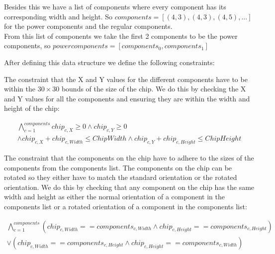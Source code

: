 \documentclass[12pt]{article}
\begin{document}
Besides this we have a list of components where every component has its corresponding width and height. So $components = [(4,3),(4,3),(4,5),...]$ for the power components and the regular components.\\
From this list of components we take the first 2 components to be the power components, so $powercomponents = [ components_0, components_1 ]$

After defining this data structure we define the following constraints:

The constraint that the X and Y values for the different components have to be within the $30 \times 30$ bounds of the size of the chip. We do this by checking the X and Y values for all the components and ensuring they are within the width and height of the chip:

\[ \begin{array}{c} \bigwedge_{c=1}^{components} chip_{c,X} \geq 0 \land chip_{c,Y} \geq 0  \\
\land chip_{c,X} + chip_{c,Width} \leq ChipWidth \land chip_{c,Y} + chip_{c,Height} \leq ChipHeight 
\end{array} \]

The constraint that the components on the chip have to adhere to the sizes of the components from the components list.
The components on the chip can be rotated so they either have to match the standard orientation or the rotated orientation. We do this by checking that any component on the chip has the same width and height as either the normal orientation of a component in the components list or a rotated orientation of a component in the components list:

\[ \begin{array}{c} \bigwedge_{c=1}^{components} \left( chip_{c,Width} == components_{c,Width} \land chip_{c,Height} == components_{c,Height} \right) \\
\lor \left( chip_{c,Width} == components_{c,Height} \land chip_{c,Height} == components_{c,Width} \right)
\end{array} \]
\end{document}
